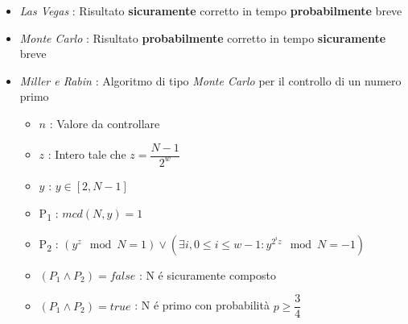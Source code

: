 \begin{itemize}
    \item \textit{Las Vegas} : Risultato \textbf{sicuramente} corretto in tempo \textbf{probabilmente} breve
    \item \textit{Monte Carlo} : Risultato \textbf{probabilmente} corretto in tempo \textbf{sicuramente} breve
    \item \textit{Miller e Rabin} : Algoritmo di tipo \textit{Monte Carlo} per il controllo di un numero primo
    \begin{itemize}
        \item $n$ : Valore da controllare
        \item $z$ : Intero tale che $z = \dfrac{N - 1}{2^w}$
        \item $y$ : $y \in [2, N-1]$ 
        \item P\textsubscript{1} : $mcd(N, y) = 1$
        \item P\textsubscript{2} : $(y^z \mod{N} = 1) \vee (\exists{i}, 0 \leq i \leq w-1 : y^{2^iz} \mod{N} = -1)$
        \item $(P_1 \wedge P_2) = false$ : N \'e sicuramente composto
        \item $(P_1 \wedge P_2) = true$ : N \'e primo con probabilità $p \geq \dfrac{3}{4}$
    \end{itemize}
\end{itemize}